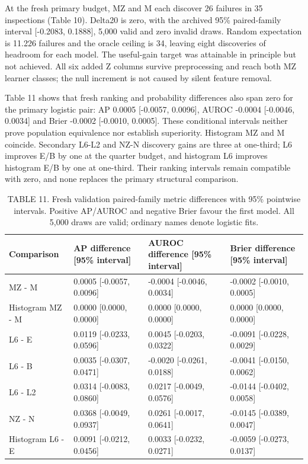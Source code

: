 At the fresh primary budget, MZ and M each discover 26 failures in 35 inspections (Table 10). Delta20 is zero, with the archived 95\% paired-family interval [-0.2083, 0.1888], 5,000 valid and zero invalid draws. Random expectation is 11.226 failures and the oracle ceiling is 34, leaving eight discoveries of headroom for each model. The useful-gain target was attainable in principle but not achieved. All six added Z columns survive preprocessing and reach both MZ learner classes; the null increment is not caused by silent feature removal.

Table 11 shows that fresh ranking and probability differences also span zero for the primary logistic pair: AP 0.0005 [-0.0057, 0.0096], AUROC -0.0004 [-0.0046, 0.0034] and Brier -0.0002 [-0.0010, 0.0005]. These conditional intervals neither prove population equivalence nor establish superiority. Histogram MZ and M coincide. Secondary L6-L2 and NZ-N discovery gains are three at one-third; L6 improves E/B by one at the quarter budget, and histogram L6 improves histogram E/B by one at one-third. Their ranking intervals remain compatible with zero, and none replaces the primary structural comparison.

\begin{table}[t]
\caption{TABLE 11. Fresh validation paired-family metric differences with 95\% pointwise intervals. Positive AP/AUROC and negative Brier favour the first model. All 5,000 draws are valid; ordinary names denote logistic fits.}
\centering\small
\begin{tabular}{llll}
\toprule Comparison & AP difference [95\% interval] & AUROC difference [95\% interval] & Brier difference [95\% interval]\\\midrule
MZ - M & 0.0005 [-0.0057, 0.0096] & -0.0004 [-0.0046, 0.0034] & -0.0002 [-0.0010, 0.0005]\\
Histogram MZ - M & 0.0000 [0.0000, 0.0000] & 0.0000 [0.0000, 0.0000] & 0.0000 [0.0000, 0.0000]\\
L6 - E & 0.0119 [-0.0233, 0.0596] & 0.0045 [-0.0203, 0.0322] & -0.0091 [-0.0228, 0.0029]\\
L6 - B & 0.0035 [-0.0307, 0.0471] & -0.0020 [-0.0261, 0.0188] & -0.0041 [-0.0150, 0.0062]\\
L6 - L2 & 0.0314 [-0.0083, 0.0860] & 0.0217 [-0.0049, 0.0576] & -0.0144 [-0.0402, 0.0058]\\
NZ - N & 0.0368 [-0.0049, 0.0937] & 0.0261 [-0.0017, 0.0641] & -0.0145 [-0.0389, 0.0047]\\
Histogram L6 - E & 0.0091 [-0.0212, 0.0456] & 0.0033 [-0.0232, 0.0271] & -0.0059 [-0.0273, 0.0137]\\\bottomrule
\end{tabular}
\end{table}


